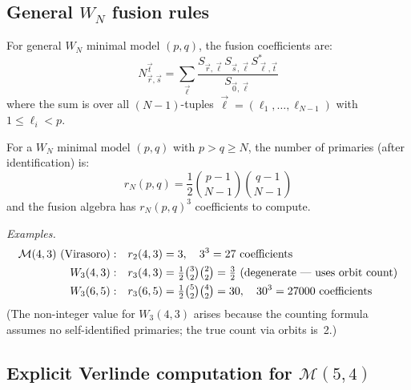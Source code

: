 \subsection{\texorpdfstring{General $W_N$ fusion rules}{General W N fusion rules}}
\label{subsec:wn-general-fusion}

\begin{theorem}\label{thm:wn-verlinde}
For general $W_N$ minimal model $(p,q)$, the fusion coefficients are:
\begin{equation}
N_{\vec{r},\vec{s}}^{\vec{t}} = \sum_{\vec{\ell}} 
\frac{S_{\vec{r},\vec{\ell}} S_{\vec{s},\vec{\ell}} S_{\vec{\ell},\vec{t}}^*}{S_{\vec{0},\vec{\ell}}}
\end{equation}
where the sum is over all $(N-1)$-tuples $\vec{\ell} = (\ell_1, \ldots, \ell_{N-1})$ 
with $1 \leq \ell_i < p$.
\end{theorem}

\begin{remark}\label{rem:wn-complexity}
For a $W_N$ minimal model $(p,q)$ with $p > q \geq N$, the number of primaries (after identification) is:
\[r_N(p,q) = \frac{1}{2}\binom{p-1}{N-1}\binom{q-1}{N-1}\]
and the fusion algebra has $r_N(p,q)^3$ coefficients to compute.

\emph{Examples.}
\begin{align}
\mathcal{M}(4,3) \text{ (Virasoro)}: \quad & r_2(4,3) = 3, \quad 3^3 = 27 \text{ coefficients} \\
W_3(4,3): \quad & r_3(4,3) = \tfrac{1}{2}\tbinom{3}{2}\tbinom{2}{2} = \tfrac{3}{2}
\text{ (degenerate --- uses orbit count)} \\
W_3(6,5): \quad & r_3(6,5) = \tfrac{1}{2}\tbinom{5}{2}\tbinom{4}{2} = 30,
\quad 30^3 = 27000 \text{ coefficients}
\end{align}
(The non-integer value for $W_3(4,3)$ arises because the counting formula assumes no self-identified primaries; the true count via orbits is~2.)
\end{remark}


\subsection{\texorpdfstring{Explicit Verlinde computation for $\mathcal{M}(5,4)$}{Explicit Verlinde computation for M(5,4)}}
\label{subsec:verlinde-5-4}

